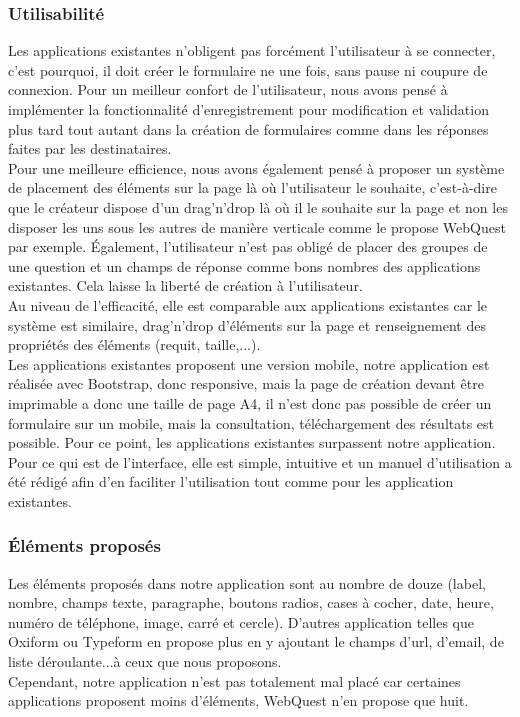 \documentclass{sigplanconf}
\begin{document}
\subsubsection{Utilisabilité}
Les applications existantes n’obligent pas forcément l’utilisateur à se connecter, c’est pourquoi, il doit créer le formulaire ne une fois, sans pause ni coupure de connexion. Pour un meilleur confort de l’utilisateur, nous avons pensé à implémenter la fonctionnalité d’enregistrement pour modification et validation plus tard tout autant dans la création de formulaires comme dans les réponses faites par les destinataires.\\
Pour une meilleure efficience, nous avons également pensé à proposer un système de placement des éléments sur la page là où l’utilisateur le souhaite, c’est-à-dire que le créateur dispose d’un drag’n’drop là où il le souhaite sur la page et non les disposer les uns sous les autres de manière verticale comme le propose WebQuest par exemple. Également, l’utilisateur n’est pas obligé de placer des groupes de une question et un champs de réponse comme bons nombres des applications existantes. Cela laisse la liberté de création à l’utilisateur.\\
Au niveau de l’efficacité, elle est comparable aux applications existantes car le système est similaire, drag’n’drop d’éléments sur la page et renseignement des propriétés des éléments (requit, taille,...).\\
Les applications existantes proposent une version mobile, notre application est réalisée avec Bootstrap, donc responsive, mais la page de création devant être imprimable a donc une taille de page A4, il n’est donc pas possible de créer un formulaire sur un mobile, mais la consultation, téléchargement des résultats est possible. Pour ce point, les applications existantes surpassent notre application.\\
Pour ce qui est de l’interface, elle est simple, intuitive et un manuel d’utilisation a été rédigé afin d’en faciliter l’utilisation tout comme pour les application existantes.
\subsubsection{Éléments proposés}
Les éléments proposés dans notre application sont au nombre de douze (label, nombre, champs texte, paragraphe, boutons radios, cases à cocher, date, heure, numéro de téléphone, image, carré et cercle). D’autres application telles que Oxiform ou Typeform en propose plus en y ajoutant le champs d’url, d’email, de liste déroulante...à ceux que nous proposons.\\ Cependant, notre application n’est pas totalement mal placé car certaines applications proposent moins d’éléments, WebQuest n’en propose que huit.
\end{document}

